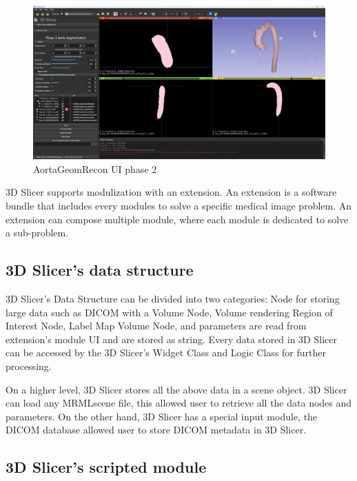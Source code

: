 \begin{figure}[ht]
    \centering
    \includegraphics[width=\textwidth]{figures/Sample/SlicerUI_2.png}
    \caption[AortaGeomRecon phase 2 User Interface]{AortaGeomRecon UI phase 2}
    \label{fig_UI_2}
\end{figure}

3D Slicer supports modulization with an extension. An extension is a software bundle that includes every modules to solve a specific medical image problem. An extension can compose multiple module, where each module is dedicated to solve a sub-problem.


\subsection{3D Slicer's data structure}

3D Slicer's Data Structure can be divided into two categories: Node for storing large data such as DICOM with a Volume Node, Volume rendering Region of Interest Node, Label Map Volume Node, and parameters are read from extension's module UI and are stored as string. Every data stored in 3D Slicer can be accessed by the 3D Slicer's Widget Class and Logic Class for further processing.

On a higher level, 3D Slicer stores all the above data in a scene object. 3D Slicer can load any MRMLscene file, this allowed user to retrieve all the data nodes and parameters. On the other hand, 3D Slicer has a special input module, the DICOM database allowed user to store DICOM metadata in 3D Slicer.

\subsection{3D Slicer's scripted module}

